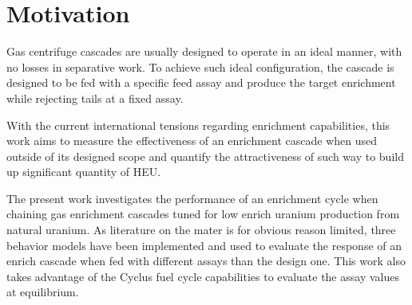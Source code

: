 \section{Motivation}

Gas centrifuge cascades are usually designed to operate in an ideal manner, with
no losses in separative work. To achieve such ideal configuration, the cascade
is designed to be fed with a specific feed assay and produce the target
enrichment while rejecting tails at a fixed assay.

With the current international tensions regarding enrichment capabilities, this
work aims to measure the effectiveness of an enrichment cascade when used outside of
its designed scope and quantify the attractiveness of such way to build up
significant quantity of \gls{HEU}.

The present work investigates the performance of an enrichment cycle when chaining
gas enrichment cascades tuned for low enrich uranium production from natural
uranium. As literature on the mater is for obvious reason limited, three
behavior models have been implemented and used to evaluate the response of an
enrich cascade when fed with different assays than the design one. This work
also takes advantage of the Cyclus\cite{cyclus} fuel cycle capabilities to
evaluate the assay values at equilibrium.

